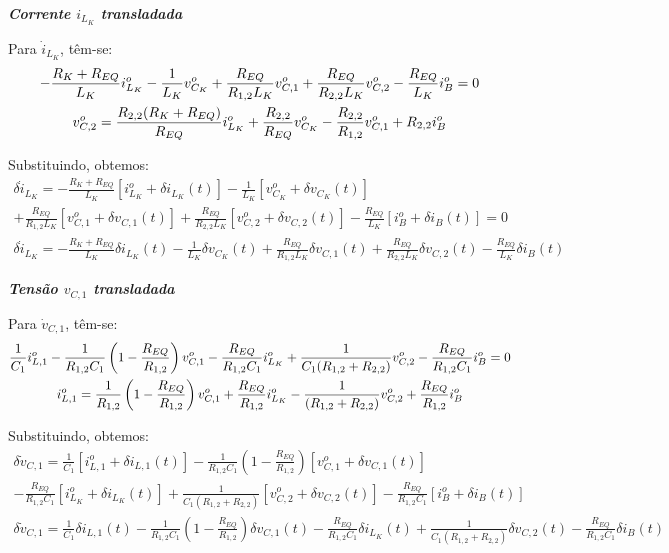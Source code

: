 \textbf{\textit{Corrente $i_{L_K}$ transladada}} \vspace*{12pt}

Para $\dot{i}_{L_K}$, têm-se:
\begin{gather}
  - \frac{R_K + R_{EQ}}{L_K} i_{L_K}^o - \frac{1}{L_K} v_{C_K}^o + \frac{R_{EQ}}{{R_{1,2}}L_K} v_{C,1}^o + \frac{R_{EQ}}{R_{2,2}L_K} v_{C,2}^o - \frac{R_{EQ}}{L_K} i_B^o= 0 \nle
  v_{C,2}^o = \frac{R_{2,2}(R_K + R_{EQ})}{R_{EQ}} i_{L_K}^o + \frac{R_{2,2}}{R_{EQ}} v_{C_K}^o - \frac{R_{2,2}}{{R_{1,2}}} v_{C,1}^o + R_{2,2}i_B^o
\end{gather}

Substituindo, obtemos:
\begin{multline*}
  \delta \dot{i}_{L_K} = - \frac{R_K + R_{EQ}}{L_K} \left[i_{L_K}^o + \delta i_{L_K}(t)\right]
  - \frac{1}{L_K} \left[v_{C_K}^o + \delta v_{C_K}(t)\right] \\
  + \frac{R_{EQ}}{{R_{1,2}}L_K} \left[v_{C,1}^o + \delta v_{C,1}(t)\right]
  + \frac{R_{EQ}}{R_{2,2}L_K} \left[v_{C,2}^o + \delta v_{C,2}(t)\right] - \frac{R_{EQ}}{L_K} \left[i_B^o + \delta i_B(t)\right] = 0
\end{multline*}
\begin{gather}
  \delta \dot{i}_{L_K} = - \frac{R_K + R_{EQ}}{L_K} \delta i_{L_K}(t)
  - \frac{1}{L_K} \delta v_{C_K}(t)
  + \frac{R_{EQ}}{{R_{1,2}}L_K} \delta v_{C,1}(t)
  + \frac{R_{EQ}}{R_{2,2}L_K} \delta v_{C,2}(t)
  - \frac{R_{EQ}}{L_K} \delta i_B(t)
\end{gather}

\textbf{\textit{Tensão $v_{C,1}$ transladada}} \vspace*{12pt}

Para $\dot{v}_{C,1}$, têm-se:
\begin{gather}
  \frac{1}{C_1} i_{L,1}^o - \frac{1}{R_{1,2}C_1} \left(1 - \frac{R_{EQ}}{{R_{1,2}}}\right) v_{C,1}^o - \frac{R_{EQ}}{R_{1,2} C_1} i_{L_K}^o + \frac{1}{C_1 (R_{1,2} + R_{2,2})} v_{C,2}^o - \frac{R_{EQ}}{R_{1,2}C_1} i_B^o = 0 \nle
  i_{L,1}^o = \frac{1}{R_{1,2}} \left(1 - \frac{R_{EQ}}{{R_{1,2}}}\right) v_{C,1}^o + \frac{R_{EQ}}{R_{1,2} } i_{L_K}^o - \frac{1}{ (R_{1,2} + R_{2,2})} v_{C,2}^o + \frac{R_{EQ}}{R_{1,2}} i_B^o
\end{gather}

Substituindo, obtemos:
\begin{multline*}
  \delta \dot v_{C,1} = \frac{1}{C_1} \left[i_{L,1}^o + \delta i_{L,1}(t)\right]
  - \frac{1}{R_{1,2}C_1} \left(1 - \frac{R_{EQ}}{{R_{1,2}}}\right) \left[v_{C,1}^o + \delta v_{C,1}(t)\right] \\
  - \frac{R_{EQ}}{R_{1,2} C_1} \left[i_{L_K}^o + \delta i_{L_K}(t)\right]
  + \frac{1}{C_1 (R_{1,2} + R_{2,2})} \left[v_{C,2}^o + \delta v_{C,2}(t) \right]
  - \frac{R_{EQ}}{R_{1,2} C_1} \left[i_B^o + \delta i_B(t)\right]
\end{multline*}
\begin{gather}
  \delta \dot v_{C,1} = \frac{1}{C_1} \delta i_{L,1}(t)
  - \frac{1}{R_{1,2}C_1} \left(1 - \frac{R_{EQ}}{{R_{1,2}}}\right) \delta v_{C,1}(t)
  - \frac{R_{EQ}}{R_{1,2} C_1} \delta i_{L_K}(t)
  + \frac{1}{C_1 (R_{1,2} + R_{2,2})} \delta v_{C,2}(t)
  - \frac{R_{EQ}}{R_{1,2} C_1} \delta i_B(t)
\end{gather}

